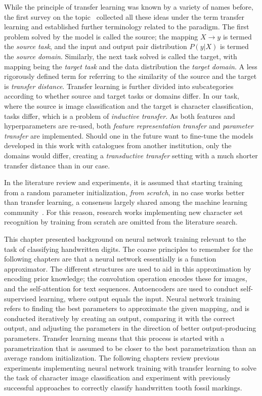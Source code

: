 \documentclass[english,twoside,openright]{UH_DS_MSc}
\begin{document}
While the principle of transfer learning was known by a variety of names before, the first survey on the topic~\cite{transferlearning_survey} collected all these ideas under the term transfer learning and established further terminology related to the paradigm. The first problem solved by the model is called the source;
the mapping $X\to y$ is termed the \textit{source task}, and the input and output pair distribution $P(y|X)$ is termed the \textit{source domain}.
Similarly, the next task solved is called the target, with mapping being the \textit{target task} and the data distribution the \textit{target domain}.
A less rigorously defined term for referring to the similarity of the source and the target is \textit{transfer distance}. Transfer learning is further divided into subcategories according to whether source and target tasks or domains differ. In our task, where the source is image classification and the target is character classification, tasks differ, which is a problem of \textit{inductive transfer}.
As both features and hyperparameters are re-used, both \textit{feature representation transfer} and \textit{parameter transfer} are implemented. Should one in the future want to fine-tune the models 
developed in this work with catalogues from another institution, only the domains would differ, creating a \textit{transductive transfer} setting with a much shorter transfer distance than in our case.

In the literature review and experiments, it is assumed that starting training from a random parameter initialization, \textit{from scratch}, in no case works 
better than transfer learning, a consensus largely shared among the machine learning community~\cite{cs231n_transfer_learning}.
For this reason, research works implementing new character set recognition by training from scratch are omitted from the literature search.

\bigskip
\noindent This chapter presented background on neural network training relevant to the task 
of classifying handwritten digits. The coarse principles to remember for the following chapters 
are that a neural network essentially is a function approximator. The different structures are 
used to aid in this approximation by encoding prior knowledge; the convolution operation encodes these 
for images, and the self-attention for text sequences. Autoencoders are used to conduct self-supervised
learning, where output equals the input. Neural network training refers to finding the best 
parameters to approximate the given mapping, and is conducted iteratively by creating 
an output, comparing it with the correct output, and adjusting the parameters in the direction 
of better output-producing parameters. Transfer learning means that this process is started with a 
 parametrization that is assumed to be closer to the best parametrization than an average 
random initialization. The following chapters review previous experiments implementing 
neural network training with transfer learning to solve the task of character image classification and experiment with previously successful approaches to correctly classify handwritten tooth fossil markings.
\end{document}
